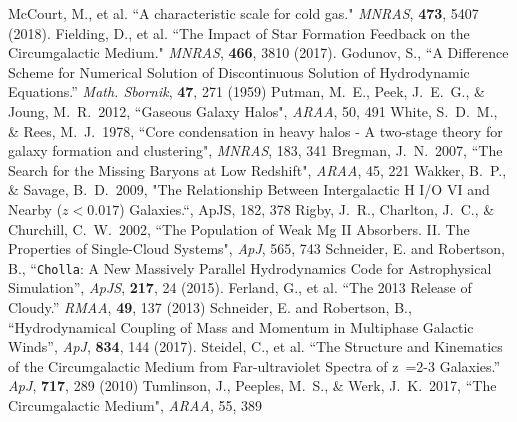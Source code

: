 \documentclass[11pt,letterpaper,english]{article}
\begin{document}
{\footnotesize

\renewcommand{\section}[2]{}
\begin{thebibliography}{500}
 McCourt, M., et al. ``A characteristic scale for cold gas." {\em MNRAS}, {\bf 473}, 5407 (2018).
 Fielding, D., et al. ``The Impact of Star Formation Feedback on the Circumgalactic Medium." {\em MNRAS}, {\bf 466}, 3810 (2017).
 Godunov, S., ``A Difference Scheme for Numerical Solution of Discontinuous Solution of Hydrodynamic Equations.'' {\em Math. Sbornik}, {\bf 47}, 271 (1959)
 Putman, M.~E., Peek, J.~E.~G., \& Joung, M.~R.\ 2012,  ``Gaseous Galaxy Halos", {\em ARAA}, 50, 491 
 White, S.~D.~M., \& Rees, M.~J.\ 1978,  ``Core condensation in heavy halos - A two-stage theory for galaxy formation and clustering", {\em MNRAS}, 183, 341 
 Bregman, J.~N.\ 2007,  ``The Search for the Missing Baryons at Low Redshift", {\em ARAA}, 45, 221 
  Wakker, B.~P.,  \& Savage, B.~D.\ 2009,  "The Relationship Between Intergalactic H I/O VI and Nearby ($z < 0.017$) Galaxies.``, {\rm ApJS}, 182, 378
 Rigby, J.~R., Charlton, J.~C., \& Churchill, C.~W.\ 2002,  ``The Population of Weak Mg II Absorbers. II. The Properties of Single-Cloud Systems", {\em ApJ}, 565, 743 
 Schneider, E. and Robertson, B., ``{\tt Cholla}: A New Massively Parallel Hydrodynamics Code for Astrophysical Simulation'', {\em ApJS}, {\bf 217}, 24 (2015).
\vspace{-.09in}
 Ferland, G., et al. ``The 2013 Release of Cloudy.'' {\em RMAA}, {\bf 49}, 137 (2013)
\vspace{-.09in}
 Schneider, E. and Robertson, B., ``Hydrodynamical Coupling of Mass and Momentum in Multiphase Galactic Winds'', {\em ApJ}, {\bf 834}, 144 (2017).
\vspace{-.09in}
 Steidel, C., et al. ``The Structure and Kinematics of the Circumgalactic Medium from Far-ultraviolet Spectra of z~=2-3 Galaxies.'' {\em ApJ}, {\bf 717}, 289 (2010)
 Tumlinson, J., Peeples, M.~S., \& Werk, J.~K.\ 2017,  ``The Circumgalactic Medium", {\em ARAA}, 55, 389 
\vspace{-.09in}
\end{thebibliography}
}
\end{document}
